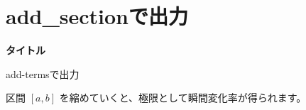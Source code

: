 \documentclass{ltjsarticle}
\begin{document}
\section*{add\_sectionで出力}

\begin{tcolorbox}[enhanced, colback=white, colframe=black, boxrule=0.4pt, arc=5pt]
{\large\textbf{タイトル}}\par
add-termsで出力
\end{tcolorbox}


区間 $[a,b]$ を縮めていくと、極限として瞬間変化率が得られます。
\end{document}
